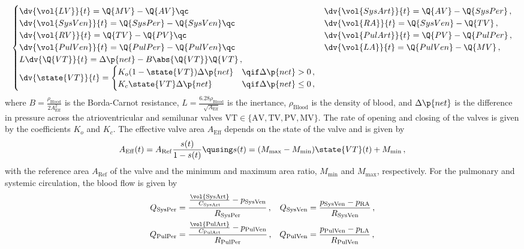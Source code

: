 \begin{equation}
\begin{cases}
\dv{\vol{LV}}{t} = \Q{MV} - \Q{AV} \qc& 
\dv{\vol{SysArt}}{t} = \Q{AV} - \Q{SysPer} \,, \\
\dv{\vol{SysVen}}{t} = \Q{SysPer} - \Q{SysVen} \qc& 
\dv{\vol{RA}}{t} = \Q{SysVen} - \Q{TV} \,, \\
\dv{\vol{RV}}{t} = \Q{TV} - \Q{PV} \qc& 
\dv{\vol{PulArt}}{t} = \Q{PV} - \Q{PulPer} \,, \\
\dv{\vol{PulVen}}{t} = \Q{PulPer} - \Q{PulVen} \qc& 
\dv{\vol{LA}}{t} = \Q{PulVen} - \Q{MV} \,, \\
L \dv{\Q{VT}}{t} = \Delta\p{net} - B \abs{\Q{VT}} \Q{VT}\,,& \\
\dv{\state{VT}}{t} = 
\begin{cases}
K_o (1 - \state{VT}) \Delta\p{net} & \qif \Delta\p{net} > 0\,, \\
K_c \state{VT} \Delta\p{net} & \qif \Delta\p{net} \leq 0\,,
\end{cases}
\end{cases} \label{eq:Circ}
\end{equation}
where $B=\frac{\rho_\mathrm{Blood}}{2 A_\mathrm{Eff}^2}$ is the Borda-Carnot resistance, $L = \frac{6.28 \rho_\mathrm{Blood}}{\sqrt{A_\mathrm{Eff}}}$ is the inertance, $\rho_\mathrm{Blood}$ is the density of blood, and $\Delta\p{net}$ is the difference in pressure across the atrioventricular and semilunar valves $\mathrm{VT} \in \{\mathrm{AV,TV,PV,MV}\}$.
The rate of opening and closing of the valves is given by the coefficients $K_o$ and $K_c$.
The effective valve area $A_\mathrm{Eff}$ depends on the state of the valve and is given by
\begin{equation}
    A_\mathrm{Eff}(t) = A_\mathrm{Ref} \frac{s(t)}{1 - s(t)} \qusing s(t) = (M_\mathrm{max} - M_\mathrm{min}) \state{VT}(t) + M_\mathrm{min} \,,
\end{equation}
with the reference area $A_\mathrm{Ref}$ of the valve and the minimum and maximum  area ratio, $M_\mathrm{min}$ and $M_\mathrm{max}$, respectively.
For the pulmonary and systemic circulation, the blood flow is given by
\begin{align}
    Q_{\text{SysPer}} 
        &= \frac{\frac{\vol{\text{SysArt}}}{C_\text{SysArt}} - p_\text{SysVen}}{R_\text{SysPer}} \,,&
    Q_{\text{SysVen}} 
        &=\frac{p_\text{SysVen} - p_\text{RA}}{R_\text{SysVen}} \,,\\
    Q_{\text{PulPer}} 
        &= \frac{\frac{\vol{\text{PulArt}}}{C_\text{PulArt}}  - p_\text{PulVen}}{R_\text{PulPer}} \,,&
    Q_{\text{PulVen}} 
        &= \frac{p_\text{PulVen} - p_\text{LA}}{R_\text{PulVen}} \,,
\end{align}
